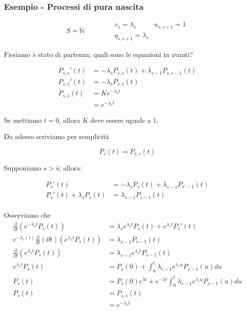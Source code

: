 \documentclass[a4paper,12pt]{book}
\begin{document}
\subsubsection{Esempio - Processi di pura nascita}

$$ S = \mathbb{N} \qquad \qquad \begin{array}{cc}
	v_s = \lambda_s & a_{s,s+1} = 1 \\
	q_{s,s+1} = \lambda_s
\end{array}$$

Fissiamo $ \bar{s} $ stato di partenza; quali sono le equazioni in avanti?

\begin{align*}
	P_{\bar{s},s}'(t) & = -\lambda_s P_{\bar{s},s}(t) + \lambda_{s-1}P_{\bar{s},s-1}(t) \\
	P_{\bar{s},\bar{s}}'(t) & = -\lambda_{\bar{s}} P_{\bar{s},\bar{s}}(t) \\
	P_{\bar{s},\bar{s}}(t) & = Ke^{-\lambda_{\bar{s}}t} \\
	& = e^{-\lambda_{\bar{s}} t}
\end{align*}

Se mettiamo $ t=0 $, allora $ K $ deve essere uguale a 1.

Da adesso scriviamo per semplicità 

$$ P_s(t) = P_{\bar{s},s}(t) $$

Supponiamo $ s > \bar{s} $; allora:

\begin{align*}
	P_s'(t) & = -\lambda_s P_s(t) + \lambda_{s-1}P_{s'-1}(t) \\ 
	P_s'(t) + \lambda_s P_s(t) & = \lambda_{s-1} P_{s-1}(t) \\
\end{align*}

Osserviamo che 
\begin{align*}
	\frac{\partial}{\partial t}(e^{-\lambda_s t} P_s(t)) & = \lambda_s e^{\lambda_s t} P_s(t) + e^{\lambda_s t}P_s'(t) \\
	e^{-\lambda_s(t)} \frac{\partial}{\partial t}(\partial t)(e^{\lambda_s t}P_s(t)) & = \lambda_{s-1} P_{s-1}(t) \\
	\frac{\partial}{\partial t}(e^{\lambda_s t} P_s(t)) & = \lambda_{s-1}e^{\lambda_s t} P_{s-1}(t) \\
	e^{\lambda_s t}P_s(t) & = P_s(0) + \int_{0}^{t} \lambda_{s-1}e^{\lambda_s u} P_{s-1}(u) du \\
	P_s(t) & = P_s(0) e^{\lambda t} + e^{-\lambda t} \int_0^t \lambda_{s-1} e^{\lambda_s u} P_{s-1}(u)du \\
	P_s(t) & = P_{\bar{s}, \bar{s}}(t) \\
	& = e^{-\lambda_{\bar{s}} t}
\end{align*}
\end{document}
